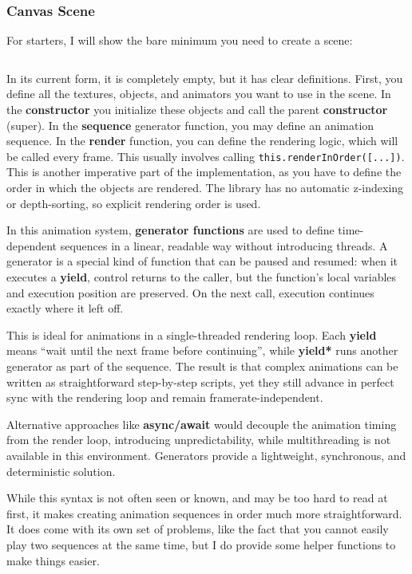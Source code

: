 \vspace{45pt}

\subsubsection{Canvas Scene}
\label{subsubsec:canvas-scene}

For starters, I will show the bare minimum you need to create a scene:

\inputminted{typescript}{code/minimum-scene.tex}

In its current form, it is completely empty, but it has clear definitions. First, you define all the textures, objects, and animators you want to use in the scene. In the \textbf{constructor} you initialize these objects and call the parent \textbf{constructor} (super). In the \textbf{sequence} generator function, you may define an animation sequence. In the \textbf{render} function, you can define the rendering logic, which will be called every frame. This usually involves calling {\footnotesize\texttt{this.renderInOrder([...])}}. This is another imperative part of the implementation, as you have to define the order in which the objects are rendered. The library has no automatic z-indexing or depth-sorting, so explicit rendering order is used.

\begin{Note}
    In this animation system, \textbf{generator functions} are used to define time-dependent sequences in a linear, readable way without introducing threads. A generator is a special kind of function that can be paused and resumed: when it executes a \textbf{yield}, control returns to the caller, but the function's local variables and execution position are preserved. On the next call, execution continues exactly where it left off.

    \vspace{10pt}

    This is ideal for animations in a single-threaded rendering loop. Each \textbf{yield} means “wait until the next frame before continuing”, while
    \textbf{yield*} runs another generator as part of the sequence. The result is that complex animations can be written as straightforward step-by-step scripts, yet they still advance in perfect sync with the rendering loop and remain framerate-independent.

    \vspace{10pt}

    Alternative approaches like \textbf{async/await} would decouple the animation timing from the render loop, introducing unpredictability, while multithreading is not available in this environment. Generators provide a lightweight, synchronous, and deterministic solution.

    \vspace{10pt}

    While this syntax is not often seen or known, and may be too hard to read at first, it makes creating animation sequences in order much more straightforward. It does come with its own set of problems, like the fact that you cannot easily play two sequences at the same time, but I do provide some helper functions to make things easier.
\end{Note}

